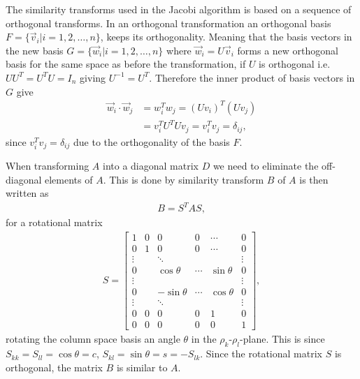 \documentclass[twocolumn]{aastex62}
\begin{document}
The similarity transforms used in the Jacobi algorithm is based on a sequence of orthogonal transforms. In an orthogonal transformation an orthogonal basis $F = \{\vec{v}_i | i = 1, 2, \ldots, n\}$, keeps its orthogonality. Meaning that the basis vectors in the new basis $G = \{\vec{w}_i | i = 1, 2, \ldots, n\}$ where $\vec{w}_i = U\vec{v}_i$ forms a new orthogonal basis for the same space as before the transformation, if $U$ is orthogonal i.e. $UU^T = U^TU = I_n$ giving $U^{-1} = U^T$. Therefore the inner product of basis vectors in $G$ give 
\begin{align}
	\vec{w}_i\cdot \vec{w}_j &= w_i^Tw_j = (Uv_i)^T(Uv_j) \\
	&= v_i^TU^TUv_j = v_i^Tv_j = \delta_{ij},
\end{align}
since $v_i^Tv_j = \delta_{ij}$ due to the orthogonality of the basis $F$.

When transforming $A$ into a diagonal matrix $D$ we need to eliminate the off-diagonal elements of $A$. This is done by similarity transform $B$ of $A$ is then written as  
\begin{align}
	B = S^T A S,
\end{align}
for a rotational matrix 
\begin{align}
S = 
	\begin{bmatrix}
		1 & 0 & 0 & 0 & \cdots & 0\\
		0 & 1 & 0 & 0 & \cdots & 0 \\	
		\vdots & & \ddots & & & \vdots \\
		0 & & \cos\theta & \cdots & \sin\theta & 0\\
		\vdots & & & & & \vdots \\
		0 & & -\sin\theta & \cdots & \cos\theta & 0\\
		\vdots & & \ddots & & & \vdots \\
		0 & 0 & 0 & 0 & 1 & 0\\		
		0 & 0 & 0 & 0 & 0 & 1
	\end{bmatrix},
\end{align}
rotating the column space basis an angle $\theta$ in the $\rho_k$-$\rho_l$-plane. This is since $S_{kk} = S_{ll} = \cos\theta = c$, $S_{kl} = \sin\theta = s = -S_{lk}$. Since the rotational matrix $S$ is orthogonal, the matrix $B$ is similar to $A$. 
\end{document}
